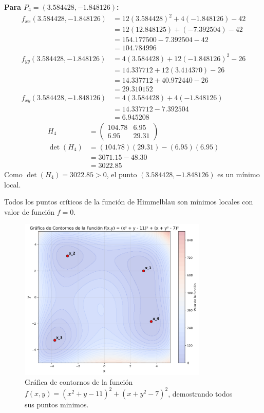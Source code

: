 \documentclass{article}
\begin{document}
\textbf{Para $P_4 = (3.584428, -1.848126)$:}
\begin{align}
f_{xx}(3.584428, -1.848126) &= 12(3.584428)^2 + 4(-1.848126) - 42 \\
&= 12(12.848125) + (-7.392504) - 42 \\
&= 154.177500 - 7.392504 - 42 \\
&= 104.784996 \\
f_{yy}(3.584428, -1.848126) &= 4(3.584428) + 12(-1.848126)^2 - 26 \\
&= 14.337712 + 12(3.414370) - 26 \\
&= 14.337712 + 40.972440 - 26 \\
&= 29.310152 \\
f_{xy}(3.584428, -1.848126) &= 4(3.584428) + 4(-1.848126) \\
&= 14.337712 - 7.392504 \\
&= 6.945208
\end{align}
\begin{align}
H_4 &= \begin{pmatrix} 104.78 & 6.95 \\ 6.95 & 29.31 \end{pmatrix} \\
\det(H_4) &= (104.78)(29.31) - (6.95)(6.95) \\
&= 3071.15 - 48.30 \\
&= 3022.85
\end{align}
Como $\det(H_4) = 3022.85 > 0$, el punto $(3.584428, -1.848126)$ es un mínimo local.

Todos los puntos críticos de la función de Himmelblau son mínimos locales con valor de función $f = 0$.

\begin{figure}[h]
\centering
\includegraphics[width=0.8\textwidth]{images/6d_plot.png}
\caption{Gráfica de contornos de la función $f(x,y) = (x^{2} + y - 11)^{2} + (x + y^{2} - 7)^{2}$, demostrando todos sus puntos minimos.}
\label{fig:6a_contour}
\end{figure}
\end{document}
